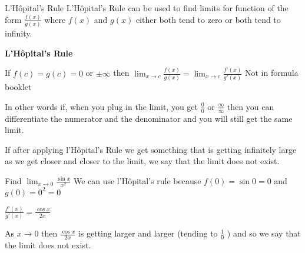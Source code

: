 \documentclass[8pt]{beamer}
\begin{document}
\begin{frame}{L'H\^opital's Rule}
	L'H\^opital's Rule can be used to find limits for function of the form $\frac{f(x)}{g(x)}$ where $f(x)$ and $g(x)$ either both tend to zero or both tend to infinity.

	\begin{definition}
		\textbf{L'H\^opital's Rule} 

		If $f(c)=g(c)=0$ or  $\pm \infty$ then  $\lim_{x\to c} \frac{f(x)}{g(x)}=\lim_{x\rightarrow c} \frac{f'(x)}{g'(x)}$ \alert{Not in formula booklet}
	\end{definition}

	In other words if, when you plug in the limit, you get $\frac{0}{0}$ or $\frac{\infty}{\infty}$ then you can differentiate the numerator and the denominator and you will still get the same limit.

	\begin{definition}
		If after applying l'H\^opital's Rule we get something that is getting infinitely large as we get closer and closer to the limit, we say that the limit does not exist.
	\end{definition}

	\begin{exampleblock}{Find $\lim_{x\to 0} \frac{\sin x}{x^2}$}
		We can use l'H\^opital's rule because $f(0)=\sin 0 = 0$ and  $g(0)=0^2=0$

		$\frac{f'(x)}{g'(x)}=\frac{\cos x }{2x}$ 

		As $x\to 0$ then $\frac{\cos x}{2x}$ is getting larger and larger (tending to $\frac{1}{0}$ ) and so we say that the limit does not exist.
	\end{exampleblock}
\end{frame}
\end{document}
